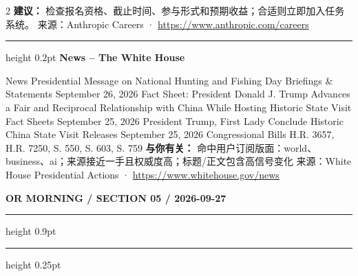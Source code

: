 \documentclass[10.5pt]{ctexart}
\begin{document}
\begin{multicols}{2}
\textbf{建议：} 检查报名资格、截止时间、参与形式和预期收益；合适则立即加入任务系统。
{\footnotesize\color{ormuted} 来源：Anthropic Careers · \url{https://www.anthropic.com/careers}}
\vspace{2mm}
\hrule height 0.2pt
\vspace{2mm}
{\large\bfseries News – The White House}\par
News Presidential Message on National Hunting and Fishing Day Briefings \& Statements September 26, 2026 Fact Sheet: President Donald J. Trump Advances a Fair and Reciprocal Relationship with China While Hosting Historic State Visit Fact Sheets September 25, 2026 President Trump, First Lady Conclude Historic China State Visit Releases September 25, 2026 Congressional Bills H.R. 3657, H.R. 7250, S. 550, S. 603, S. 759 
\textbf{与你有关：} 命中用户订阅版面：world、business、ai；来源接近一手且权威度高；标题/正文包含高信号变化
{\footnotesize\color{ormuted} 来源：White House Presidential Actions · \url{https://www.whitehouse.gov/news}}
\end{multicols}
\newpage
{\small\bfseries OR MORNING / SECTION 05 / 2026-09-27}
\vspace{2mm}
\hrule height 0.9pt
\vspace{1.5mm}
\hrule height 0.25pt
\vspace{4mm}
\end{document}
